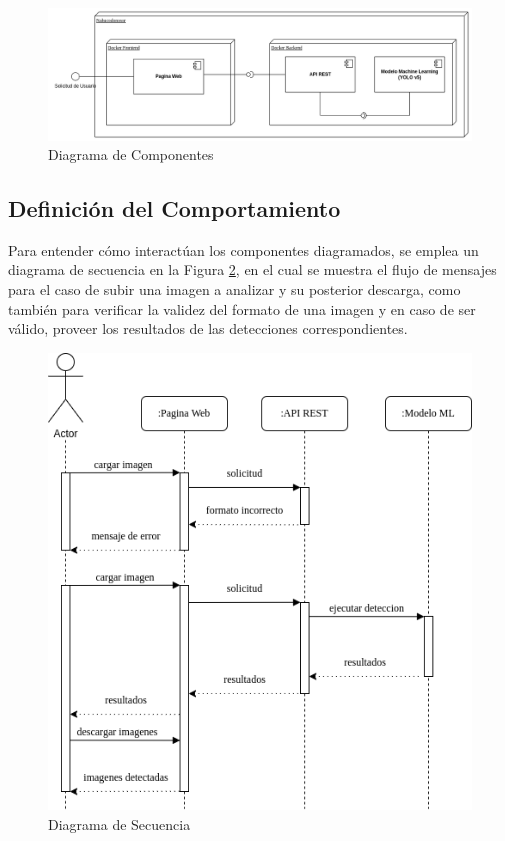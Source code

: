 \begin{figure}[h!]
    \centering
    \includegraphics[width=1\textwidth]{img/Diagrama de Componentes.drawio.png}
    \caption{Diagrama de Componentes}
    \label{fig:componentes}
\end{figure}

\newpage
\subsection{Definición del Comportamiento}

Para entender cómo interactúan los componentes diagramados, se emplea un diagrama de secuencia en la Figura \ref{fig:secuencia}, en el cual se muestra el flujo de mensajes para el caso de subir una imagen a analizar y su posterior descarga, como también para verificar la validez del formato de una imagen y en caso de ser válido, proveer los resultados de las detecciones correspondientes.

\begin{figure}[h!]
    \centering
    \includegraphics[width=1\textwidth]{img/Diagrama de Secuencia.drawio.png}
    \caption{Diagrama de Secuencia}
    \label{fig:secuencia}
\end{figure}


